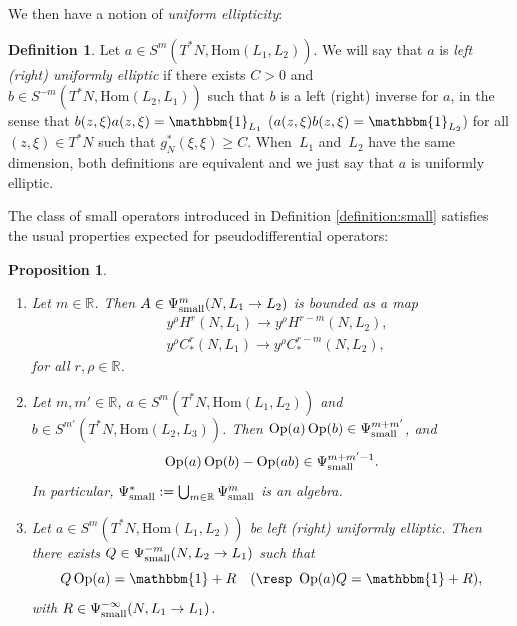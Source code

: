 \documentclass[10pt]{amsart}
\newcommand{\R}{\mathbb{R}}
\DeclareMathOperator{\Op}{Op}
\theoremstyle{plain}
\newtheorem{proposition}{Proposition}[section]
\theoremstyle{definition}
\newtheorem{definition}{Definition}[section]
\providecommand{\skpt}{\par\smallskip\noindent}
\begin{document}
We then have a notion of \emph{uniform ellipticity}:

\begin{definition}\label{def:elliptic}
Let $a\in S^m(T^\ast N,\mathrm{Hom}(L_1,L_2))$. We will say that $a$ is \emph{left (\resp right) uniformly elliptic} if there exists $C > 0$ and $b\in S^{-m}(T^\ast N,\mathrm{Hom}(L_2,L_1))$ such that $b$ is a left (\resp right) inverse for $a$, in the sense that $b(z,\xi)a(z,\xi) = \mathbbm{1}_{L_1}$ (\resp $a(z,\xi)b(z,\xi) = \mathbbm{1}_{L_2}$) for all $(z,\xi) \in T^*N$ such that $g_N^*(\xi,\xi) \geq C$. When~$L_1$ and~$L_2$ have the same dimension, both definitions are equivalent and we just say that $a$ is uniformly elliptic.
\end{definition}

The class of small operators introduced in Definition \ref{definition:small} satisfies the usual properties expected for pseudodifferential operators:

\skpt
\begin{proposition}\label{prop:microlocal-calculus}
\begin{enumerate}
\item Let $m \in \R$. Then $A \in \Psi^m_{\textup{small}}(N, L_1\to L_2)$ is bounded as a map
\[
\begin{split}
&y^\rho H^r(N,L_1) \to y^\rho H^{r-m}(N,L_2), \\
& y^\rho C^r_*(N,L_1) \to y^\rho C^{r-m}_*(N,L_2),
\end{split}
\]
for all $r,\rho\in \R$.
\item Let $m, m' \in \R$, $a\in S^m(T^\ast N,\mathrm{Hom}(L_1,L_2))$ and $b\in S^{m'}(T^\ast N,\mathrm{Hom}(L_2,L_3))$. Then $\Op(a)\Op(b)\in \Psi^{m+m'}_{\textup{small}}$, and
\[
\Op(a)\Op(b) - \Op(ab) \in \Psi^{m+m' - 1}_{\textup{small}}.
\]
In particular, $\Psi^*_{\textup{small}} := \bigcup_{m \in \R} \Psi^m_{\textup{small}}$ is an algebra.

\item Let $a\in S^m(T^\ast N, \mathrm{Hom}(L_1,L_2))$ be left (\resp right) uniformly elliptic. Then there exists $Q \in \Psi^{-m}_{\textup{small}}(N,L_2 \to L_1)$ such that
\[
Q \Op(a) = \mathbbm{1} + R \quad (\text{\resp } \Op(a) Q = \mathbbm{1} + R),
\]
with $R \in \Psi^{-\infty}_{\textup{small}}(N,L_1\to L_1)$.
\end{enumerate}

\end{proposition}
\end{document}
